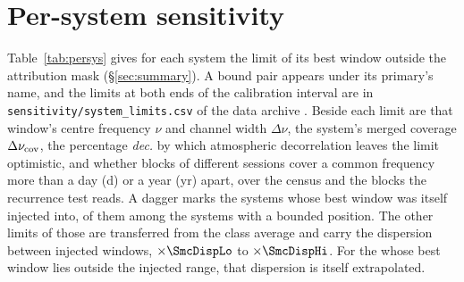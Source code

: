 \section{Per-system sensitivity}
\label{app:persys}

Table~\ref{tab:persys} gives for each system the limit of its best window
outside the attribution mask (\S\ref{sec:summary}). A bound pair appears
under its primary's name, and the limits at both ends of the calibration
interval are in \texttt{sensitivity/\allowbreak system\_limits.csv} of the
data archive \citep{SIdeposit}. Beside each limit are that window's centre
frequency $\nu$ and channel width $\Delta\nu$, the system's merged coverage
$\Delta\nu_{\rm cov}$, the percentage \emph{dec.} by which atmospheric
decorrelation leaves the limit optimistic, and whether blocks of different
sessions cover a common frequency more than a day (d) or a year (yr) apart,
over the census and the \ZcNRecEB{} blocks the recurrence test reads. A
dagger marks the \SmcNMeasSys{} systems whose best window was itself injected
into, \SmcNMeasSysBnd{} of them among the \NSysALimSum{} systems with a bounded
position. The other \SmcNEstSysBnd{} limits of those \NSysALimSum{} are transferred
from the class average and carry the dispersion between injected windows,
$\times\SmcDispLo$ to $\times\SmcDispHi$. For the \NgNExtrapSys{}
\NgExtrapSysNoun{} whose best window lies outside the injected range, that
dispersion is itself extrapolated.

